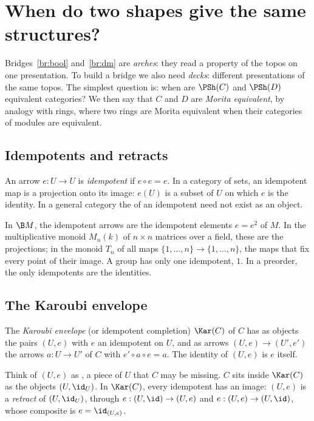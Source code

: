 \section{When do two shapes give the same structures?}\label{sec:same}

Bridges~\ref{br:bool} and~\ref{br:dm} are \emph{arches}: they read a property of the topos on one presentation. To build a bridge we also need \emph{decks}: different presentations of the same topos. The simplest question is: when are $\PSh(C)$ and $\PSh(D)$ equivalent categories? We then say that $C$ and $D$ are \emph{Morita equivalent}, by analogy with rings, where two rings are Morita equivalent when their categories of modules are equivalent.

\subsection{Idempotents and retracts}

An arrow $e : U\to U$ is \emph{idempotent} if $e\circ e = e$. In a category of sets, an idempotent map is a projection onto its image: $e(U)$ is a subset of $U$ on which $e$ is the identity. In a general category the  of an idempotent need not exist as an object.

\begin{example}
In $\B M$, the idempotent arrows are the idempotent elements $e = e^2$ of $M$. In the multiplicative monoid $M_n(k)$ of $n\times n$ matrices over a field, these are the projections; in the monoid $T_n$ of all maps $\{1,\dots,n\}\to\{1,\dots,n\}$, the maps that fix every point of their image. A group has only one idempotent, $1$. In a preorder, the only idempotents are the identities.
\end{example}

\subsection{The Karoubi envelope}

\begin{definition}
The \emph{Karoubi envelope} (or idempotent completion) $\Kar(C)$ of $C$ has as objects the pairs $(U,e)$ with $e$ an idempotent on $U$, and as arrows $(U,e)\to(U',e')$ the arrows $a : U\to U'$ of $C$ with $e'\circ a\circ e = a$. The identity of $(U,e)$ is $e$ itself.
\end{definition}

Think of $(U,e)$ as , a piece of $U$ that $C$ may be missing. $C$ sits inside $\Kar(C)$ as the objects $(U,\id_U)$. In $\Kar(C)$, every idempotent has an image: $(U,e)$ is a \emph{retract} of $(U,\id_U)$, through $e : (U,\id)\to(U,e)$ and $e : (U,e)\to(U,\id)$, whose composite is $e = \id_{(U,e)}$.

